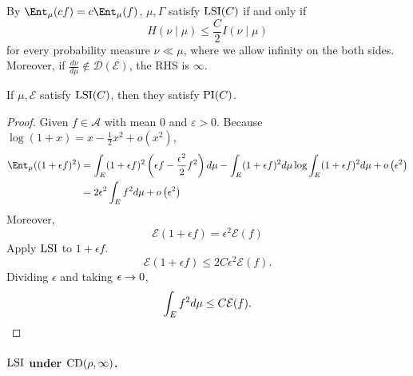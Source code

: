 By $\Ent_\mu(cf) = c\Ent_\mu(f)$, $\mu, \Gamma$ satisfy $\operatorname{LSI}(C)$ if and only if
\begin{equation*}
    H(\nu \mid \mu) \leq \frac{C}{2}I(\nu \mid \mu)
\end{equation*}
for every probability measure $\nu \ll \mu$, where we allow infinity on the both sides. Moreover, if $\frac{d \nu}{d \mu} \notin \mathcal{D}(\mathcal{E})$, the RHS is $\infty$.

\begin{prop}
    If $\mu,\mathcal{E}$ satisfy $\operatorname{LSI}(C)$, then they satisfy $\operatorname{PI}(C)$.
\end{prop}
\begin{proof}
    Given $f \in \mathcal{A}$ with mean $0$ and $\varepsilon > 0$. Because $\log(1 + x) = x -\frac{1}{2}x^2 + o(x^2)$,
    \begin{align*}
        \Ent_\mu((1 + \epsilon f)^2) &= \int_E(1+\epsilon f)^2\left(\epsilon f-\frac{\epsilon^2}{2} f^2\right) d \mu-\int_E(1+\epsilon f)^2 d \mu \log \int_E(1+\epsilon f)^2 d \mu+o\left(\epsilon^2\right) \\
        &= 2 \epsilon^2 \int_E f^2 d \mu+o\left(\epsilon^2\right)
    \end{align*}
    Moreover,
    \begin{equation*}
        \mathcal{E}(1+\epsilon f) = \epsilon^2\mathcal{E}(f)
    \end{equation*}
    Apply $\operatorname{LSI}$ to $1 + \epsilon f$.
    \begin{equation*}
        \mathcal{E}(1+\epsilon f) \leq 2C \epsilon^2\mathcal{E}(f).
    \end{equation*}
    Dividing $\epsilon$ and taking $\epsilon \rightarrow 0$,
    \begin{equation*}
        \int_E f^2 d \mu \leq C \mathcal{E}(f). \qedhere
    \end{equation*}
\end{proof}

\paragraph{$\operatorname{LSI}$ under $\operatorname{CD}(\rho,\infty)$.}

